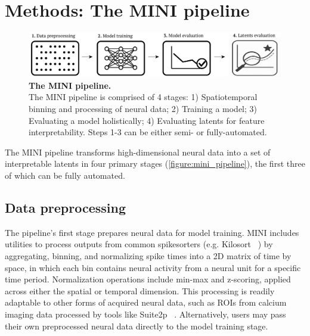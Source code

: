 \section{Methods: The MINI pipeline}

\begin{figure}[h]
    \centering
    \includegraphics[width=\linewidth]{figures/mini_pipeline.pdf}
    \caption{
        \textbf{The MINI pipeline.} \\
        \small The MINI pipeline is comprised of 4 stages: 1) Spatiotemporal binning and processing of neural data; 2) Training a model; 3) Evaluating a model holistically; 4) Evaluating latents for feature interpretability. Steps 1-3 can be either semi- or fully-automated.
    }
    \label{figure:mini_pipeline}
\end{figure}

The MINI pipeline transforms high-dimensional neural data into a set of interpretable latents in four primary stages (\autoref{figure:mini_pipeline}), the first three of which can be fully automated.

\subsection{Data preprocessing}

The pipeline's first stage prepares neural data for model training. MINI includes utilities to process outputs from common spikesorters (e.g. Kilosort ~\cite{pachitariu_2016_kilosort}) by aggregating, binning, and normalizing spike times into a 2D matrix of time by space, in which each bin contains neural activity from a neural unit for a specific time period. Normalization operations include min-max and z-scoring, applied across either the spatial or temporal dimension. This processing is readily adaptable to other forms of acquired neural data, such as ROIs from calcium imaging data processed by tools like Suite2p ~\cite{pachitariu_2017_suite2p}. Alternatively, users may pass their own preprocessed neural data directly to the model training stage.

